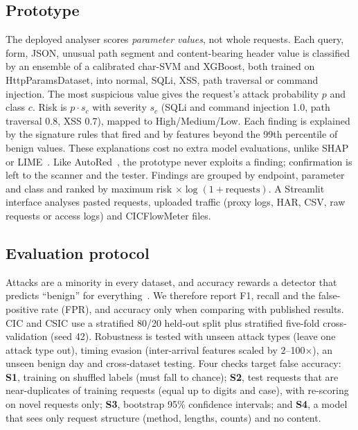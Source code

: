 \documentclass[conference]{IEEEtran}
\begin{document}
\subsection{Prototype}
The deployed analyser scores \emph{parameter values}, not whole requests. Each query, form, JSON,
unusual path segment and content-bearing header value is classified by an ensemble of a calibrated
char-SVM and XGBoost, both trained on HttpParamsDataset, into normal, SQLi, XSS, path traversal or
command injection. The most suspicious value gives the request's attack probability $p$ and class $c$.
Risk is $p\cdot s_c$ with severity $s_c$ (SQLi and command injection 1.0, path traversal 0.8, XSS 0.7),
mapped to High/Medium/Low. Each finding is explained by the signature rules that fired and by
features beyond the 99th percentile of benign values. These explanations cost no extra model
evaluations, unlike SHAP or LIME~\cite{fasla2026}. Like AutoRed~\cite{khairmode2026}, the prototype
never exploits a finding; confirmation is left to the scanner and the tester. Findings are grouped by endpoint, parameter
and class and ranked by maximum risk $\times \log(1+\text{requests})$. A Streamlit interface analyses
pasted requests, uploaded traffic (proxy logs, HAR, CSV, raw requests or access logs) and
CICFlowMeter files.

\subsection{Evaluation protocol}
Attacks are a minority in every dataset, and accuracy rewards a detector that predicts ``benign''
for everything~\cite{fasla2026}. We therefore report F1, recall and the false-positive rate (FPR),
and accuracy only when comparing with published results.
CIC and CSIC use a stratified 80/20 held-out split plus stratified five-fold cross-validation
(seed 42). Robustness is tested with unseen attack types (leave one attack type out), timing evasion
(inter-arrival features scaled by 2--100$\times$), an unseen benign day and cross-dataset testing.
Four checks target false accuracy: \textbf{S1}, training on shuffled labels (must fall to chance);
\textbf{S2}, test requests that are near-duplicates of training requests (equal up to digits and case),
with re-scoring on novel requests only; \textbf{S3}, bootstrap 95\% confidence intervals; and
\textbf{S4}, a model that sees only request structure (method, lengths, counts) and no content.
\end{document}
